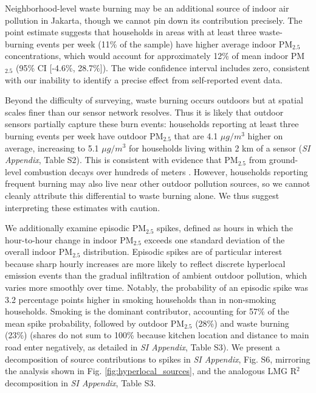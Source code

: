 \documentclass[9pt,twocolumn,twoside]{pnas-new}
\begin{document}
Neighborhood-level waste burning may be an additional source of indoor air pollution in Jakarta, though we cannot pin down its contribution precisely. 
The point estimate suggests that households in areas with at least three waste-burning events per week (11\% of the sample) have higher average indoor PM$_{2.5}$ concentrations, which would account for approximately 12\% of mean indoor PM$_{2.5}$ (95\% CI [-4.6\%, 28.7\%]).
The wide confidence interval includes zero, consistent with our inability to identify a precise effect from self-reported event data.

Beyond the difficulty of surveying, waste burning occurs outdoors but at spatial scales finer than our sensor network resolves. Thus it is likely that outdoor sensors partially capture these burn events: households reporting at least three burning events per week have outdoor PM$_{2.5}$ that are 4.1 $\mu g/m^3$ higher on average, increasing to 5.1 $\mu g/m^3$ for households living within 2 km of a sensor (\textit{SI Appendix}, Table S2). This is consistent with evidence that PM$_{2.5}$ from ground-level combustion decays over hundreds of meters \citep{WHO2013REVIHAAP}. However, households reporting frequent burning may also live near other outdoor pollution sources, so we cannot cleanly attribute this differential to waste burning alone. We thus suggest interpreting these estimates with caution.


We additionally examine episodic PM$_{2.5}$ spikes, defined as hours in which the hour-to-hour change in indoor PM$_{2.5}$ exceeds one standard deviation of the overall indoor PM$_{2.5}$ distribution. Episodic spikes are of particular interest because sharp hourly increases are more likely to reflect discrete hyperlocal emission events than the gradual infiltration of ambient outdoor pollution, which varies more smoothly over time. Notably, the probability of an episodic spike was 3.2 percentage points higher in smoking households than in non-smoking households. Smoking is the dominant contributor, accounting for 57\% of the mean spike probability, followed by outdoor PM$_{2.5}$ (28\%) and waste burning (23\%) (shares do not sum to 100\% because kitchen location and distance to main road enter negatively, as detailed in \textit{SI Appendix}, Table S3). We present a decomposition of source contributions to spikes in \textit{SI Appendix}, Fig. S6, mirroring the analysis shown in Fig. \ref{fig:hyperlocal_sources}, and the analogous LMG R$^2$ decomposition in \textit{SI Appendix}, Table S3.
\end{document}

